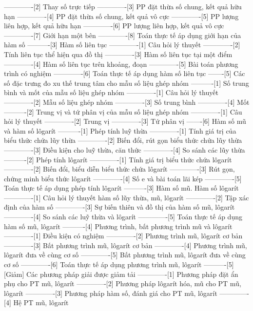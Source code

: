 -------------[2] Thay số trực tiếp
-------------[3] PP đặt thừa số chung, kết quả hữu hạn
-------------[4] PP đặt thừa số chung, kết quả vô cực
-------------[5] PP lượng liên hợp, kết quả hữu hạn
-------------[6] PP lượng liên hợp, kết quả vô cực
-------------[7] Giới hạn một bên
-------------[8] Toán thực tế áp dụng giới hạn của hàm số
----------[3] Hàm số liên tục
-------------[1] Câu hỏi lý thuyết
-------------[2] Tính liên tục thể hiện qua đồ thị
-------------[3] Hàm số liên tục tại một điểm
-------------[4] Hàm số liên tục trên khoảng, đoạn
-------------[5] Bài toán phương trình có nghiệm
-------------[6] Toán thực tế áp dụng hàm số liên tục
-------[5] Các số đặc trưng đo xu thế trung tâm cho mẫu số liệu ghép nhóm
----------[1] Số trung bình và mốt của mẫu số liệu ghép nhóm
-------------[1] Câu hỏi lý thuyết
-------------[2] Mẫu số liệu ghép nhóm
-------------[3] Số trung bình
-------------[4] Mốt
----------[2] Trung vị và tứ phân vị của mẫu số liệu ghép nhóm
-------------[1] Câu hỏi lý thuyết
-------------[2] Trung vị
-------------[3] Tứ phân vị
-------[6] Hàm số mũ và hàm số lôgarít
----------[1] Phép tính luỹ thừa
-------------[1] Tính giá trị của biểu thức chứa lũy thừa
-------------[2] Biến đổi, rút gọn biểu thức chứa lũy thừa
-------------[3] Điều kiện cho luỹ thừa, căn thức
-------------[4] So sánh các lũy thừa
----------[2] Phép tính lôgarít
-------------[1] Tính giá trị biểu thức chứa lôgarít
-------------[2] Biến đổi, biểu diễn biểu thức chứa lôgarít
-------------[3] Rút gọn, chứng minh biểu thức lôgarít
-------------[4] Số e và bài toán lãi kép
-------------[5] Toán thực tế áp dụng phép tính lôgarít
----------[3] Hàm số mũ. Hàm số lôgarít
-------------[1] Câu hỏi lý thuyết hàm số lũy thừa, mũ, lôgarít
-------------[2] Tập xác định của hàm số
-------------[3] Sự biến thiên và đồ thị của hàm số mũ, lôgarít
-------------[4] So sánh các luỹ thừa và lôgarít
-------------[5] Toán thực tế áp dụng hàm số mũ, lôgarít
----------[4] Phương trình, bất phương trình mũ và lôgarít
-------------[1] Điều kiện có nghiệm
-------------[2] Phương trình mũ, lôgarít cơ bản
-------------[3] Bất phương trình mũ, lôgarít cơ bản
-------------[4] Phương trình mũ, lôgarít đưa về cùng cơ số
-------------[5] Bất phương trình mũ, lôgarít đưa về cùng cơ số
-------------[6] Toán thực tế áp dụng phương trình mũ, lôgarít
----------[5] [Giảm] Các phương pháp giải được giảm tải
-------------[1] Phương pháp đặt ẩn phụ cho PT mũ, lôgarít
-------------[2] Phương pháp lôgarít hóa, mũ cho PT mũ, lôgarít
-------------[3] Phương pháp hàm số, đánh giá cho PT mũ, lôgarít
-------------[4] Hệ PT mũ, lôgarít
